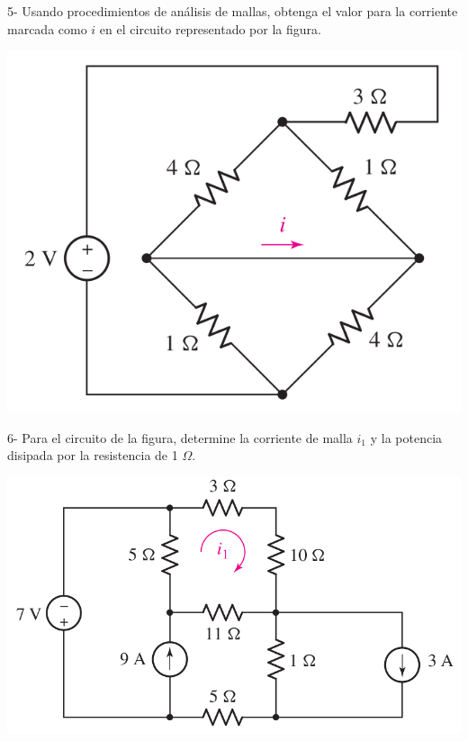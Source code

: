 \documentclass[10pt,letterpaper]{article}
\begin{document}
	5- Usando procedimientos de análisis de mallas, obtenga el valor para la corriente marcada como $i$ en el circuito representado por la figura.
	
	\includegraphics[scale=0.38]{c5}

 	6- Para el circuito de la figura, determine la corriente de malla $i_1$ y la potencia disipada por la resistencia de 1 $\Omega$.
 
 	\includegraphics[scale=0.38]{c6}
\end{document}
